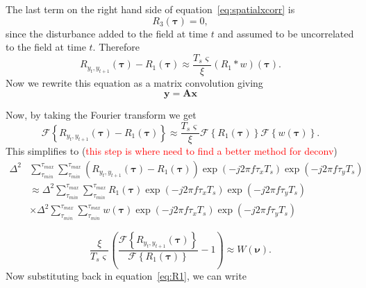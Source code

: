 \documentclass[]{article}
\newcommand{\dean}[1]{\textcolor{red}{#1}}
\begin{document}
The last term on the right hand side of equation~\ref{eq:spatialxcorr} is
\begin{equation}
	R_3(\boldsymbol{\tau}) = 0,
\end{equation}
since the disturbance added to the field at time $t$ and assumed to be uncorrelated to the field at time $t$. Therefore 
\begin{equation}
	R_{y_{t},y_{t+1}}(\boldsymbol{\tau}) - R_1(\boldsymbol{\tau}) \approx \frac{T_s \varsigma}{\xi} \left(R_1 \ast w\right)\left(\boldsymbol{\tau}\right).
\end{equation}
Now we rewrite this equation as a matrix convolution giving
\begin{equation}
	\mathbf{y} = \mathbf{A}\mathbf{x}
\end{equation}

Now, by taking the Fourier transform we get
\begin{equation}
	\mathcal{F}\left\{ R_{y_{t},y_{t+1}}(\boldsymbol{\tau}) - R_1(\boldsymbol{\tau}) \right\} \approx \frac{T_s \varsigma}{\xi} \mathcal{F} \left\{ R_1(\boldsymbol{\tau}) \right\} \mathcal{F}\left\{ w\left(\boldsymbol{\tau}\right)\right\}.
\end{equation}
This simplifies to (\dean{this step is where need to find a better method for deconv})
\begin{align}
	\Delta^2&\sum_{\tau_{min}}^{\tau_{max}}\sum_{\tau_{min}}^{\tau_{max}}\left(R_{y_{t},y_{t+1}}(\boldsymbol{\tau}) - R_1(\boldsymbol{\tau})\right) \exp\left(-j2\pi f \tau_x T_s\right)\exp\left(-j2\pi f \tau_y T_s\right) \\
	& \approx \Delta^2\sum_{\tau_{min}}^{\tau_{max}}\sum_{\tau_{min}}^{\tau_{max}} R_1(\boldsymbol{\tau}) \exp\left(-j2\pi f \tau_x T_s\right)\exp\left(-j2\pi f \tau_y T_s\right) \\
	&\times \Delta^2\sum_{\tau_{min}}^{\tau_{max}}\sum_{\tau_{min}}^{\tau_{max}} w(\boldsymbol{\tau}) \exp\left(-j2\pi f \tau_x T_s\right)\exp\left(-j2\pi f \tau_y T_s\right)
\end{align}

\begin{equation}
	\frac{\xi}{T_s \varsigma} \left(\frac{\mathcal{F}\left\{R_{y_{t},y_{t+1}}(\boldsymbol{\tau})\right\}}{\mathcal{F}\left\{R_1(\boldsymbol{\tau})\right\}} - 1\right) \approx  W\left(\boldsymbol{\nu}\right).
\end{equation}
Now substituting back in equation~\ref{eq:R1}, we can write
\end{document}
